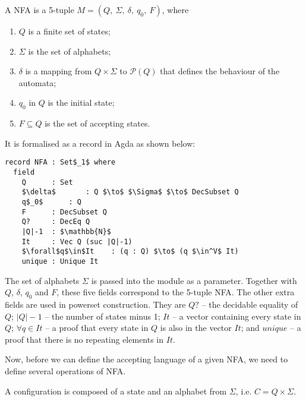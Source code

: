 \begin{defn}
\noindent A NFA is a 5-tuple \(M = (Q
,\ \Sigma,\ \delta,\ q_0,\ F)\), where
\begin{enumerate}[nolistsep]
  \item \(Q\) is a finite set of states;
  \item \(\Sigma\) is the set of alphabets;
  \item \(\delta\) is a mapping from \(Q \times \Sigma\) to
    \(\mathcal P \left({Q}\right)\) that defines the behaviour of the automata;
  \item \(q_0\) in \(Q\) is the initial state;
  \item \(F \subseteq Q\) is the set of accepting states. 
\end{enumerate}
\end{defn}

\par It is formalised as a record in Agda as shown below: 

\begin{lstlisting}[mathescape=true,xleftmargin=.3\textwidth]
record NFA : Set$_1$ where
  field
    Q      : Set
    $\delta$       : Q $\to$ $\Sigma$ $\to$ DecSubset Q
    q$_0$      : Q
    F      : DecSubset Q
    Q?     : DecEq Q
    |Q|-1  : $\mathbb{N}$
    It     : Vec Q (suc |Q|-1)
    $\forall$q$\in$It    : (q : Q) $\to$ (q $\in^V$ It)
    unique : Unique It
\end{lstlisting}

\par The set of alphabets \(\Sigma\) is passed into the module as a
parameter. Together with \(Q\), \(\delta\),
\(q_0\) and \(F\), these five fields correspond to the 5-tuple
NFA. The other extra fields are used in powerset construction. They
are \(Q?\) -- the decidable equality of \(Q\);
\(|Q|-1\) -- the number of states minus 1; \(It\) -- a vector containing every state in \(Q\); \(\forall q\in It\)
-- a proof that every state in \(Q\) is also in the vector
\(It\); and \(unique\) -- a proof that there is no repeating elements in
\(It\). 

\par Now, before we can define the accepting language of a given
NFA, we need to define several operations of NFA. 

\begin{defn}
\noindent A configuration is composed of a state and an alphabet from
\(\Sigma\), i.e. \(C = Q \times \Sigma\). 
\end{defn}

